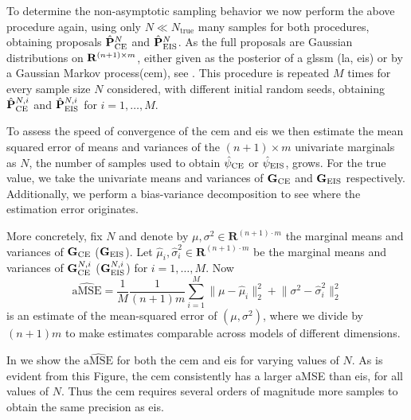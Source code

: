 To determine the non-asymptotic sampling behavior we now perform the above procedure again, using only $N \ll N_{\text{true}}$ many samples for both procedures, obtaining proposals $\hat{\mathbf P}^{N}_{{\text{CE}}}$ and $\hat {\mathbf P}^{N}_{{\text{EIS}}}$. As the full proposals are Gaussian distributions on $\mathbf R^{(n+1)\times m}$, either given as the posterior of a \gls{glssm} (\gls{la}, \gls{eis}) or by a Gaussian Markov process(\gls{cem}), see . 
This procedure is repeated $M$ times for every sample size $N$ considered, with different initial random seeds, obtaining $\hat{\mathbf P}^{N,i}_{{\text{CE}}}$ and $\hat {\mathbf P}^{N,i}_{{\text{EIS}}}$ for $i = 1, \dots, M$.

To assess the speed of convergence of the \gls{cem} and \gls{eis} we then estimate the mean squared error of means and variances of the $(n+1) \times m$ univariate marginals as $N$, the number of samples used to obtain ${\hat\psi_{\text{CE}}}$ or ${\hat\psi_{\text{EIS}}}$, grows. For the true value, we take the univariate means and variances of $\mathbf G_{{\text{CE}}}$ and $\mathbf G_{{\text{EIS}}}$ respectively. Additionally, we perform a bias-variance decomposition to see where the estimation error originates. 

More concretely, fix $N$ and denote by $\mu, \sigma^{2} \in \mathbf R^{(n + 1) \cdot m}$ the marginal means and variances of $\mathbf G_{{\text{CE}}}$ ($\mathbf G_{{\text{EIS}}}$). 
Let $\hat\mu_{i}, \hat\sigma^{2}_{i}\in\mathbf R^{(n + 1) \cdot m}$ be the marginal means and variances of $\mathbf G^{N,i}_{{\text{CE}}}$ ($\mathbf G^{N,i}_{{\text{EIS}}}$) for $i = 1,\dots, M$. 
Now 
$$
\widehat{\text{aMSE}} = \frac{1}{M} \frac{1}{(n + 1)m} \sum_{i = 1}^M \lVert \mu - \hat\mu_{i} \rVert_{2}^2 + \lVert \sigma^{2} - \hat\sigma_{i}^2 \rVert^{2}_{2}
$$
is an estimate of the mean-squared error of $(\mu, \sigma^{2})$, where we divide by $(n+1)m$ to make estimates comparable across models of different dimensions. 


In  we show the $\widehat{\text{aMSE}}$ for both the \gls{cem} and \gls{eis} for varying values of $N$. As is evident from this Figure, the \gls{cem} consistently has a larger aMSE than \gls{eis}, for all values of $N$. Thus the \gls{cem} requires several orders of magnitude more samples to obtain the same precision as \gls{eis}.

